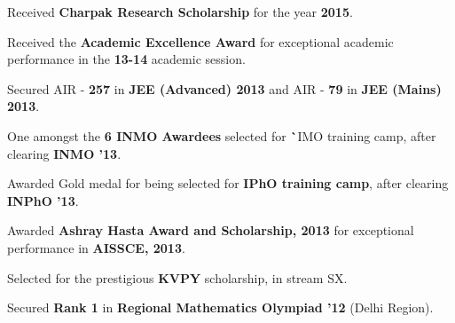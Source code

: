 \documentclass[a4paper]{norm-resume} %
\begin{document}
\begin{tightitemize}
	\item Received \textbf{Charpak Research Scholarship} for the year \textbf{2015}.
	\item Received the \textbf{Academic Excellence Award} for exceptional academic performance in the \textbf{13-14} academic session.
	\item Secured AIR - \textbf{257} in {\textbf{JEE (Advanced) 2013}} and AIR - {\textbf{79}} in \textbf{JEE (Mains) 2013}.
	\item One amongst the \textbf{6 INMO Awardees} selected for \textbf`{IMO training camp}, after clearing \textbf{INMO '13}.
	\item Awarded Gold medal for being selected for \textbf{IPhO training camp}, after clearing \textbf{INPhO '13}.
	\item Awarded \textbf{Ashray Hasta Award and Scholarship, 2013} for exceptional performance in \textbf{AISSCE, 2013}.
	\item Selected for the prestigious \textbf{KVPY} scholarship, in stream SX.
	\item Secured \textbf{Rank 1} in \textbf{Regional Mathematics Olympiad '12} (Delhi Region).	
\end{tightitemize}
	
\end{document}
